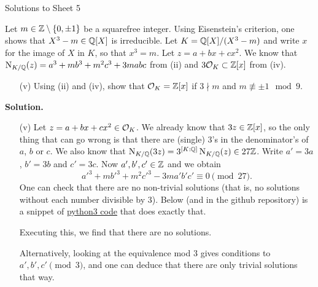 \documentclass[a4paper,11pt]{article}
\begin{document}
\begin{center}
    \huge{Solutions to Sheet 5}
\end{center}

Let $m \in \mathbb{Z} \setminus\{0, \pm 1\}$ be a squarefree integer. Using Eisenstein's
criterion, one shows that $X^3 - m \in \mathbb{Q}[X]$ is irreducible. Let $K =
\mathbb{Q}[X]/(X^3 -m)$ and write $x$ for the image of $X$ in $K$, so that $x^3 = m$.
Let $z = a + bx + cx^2$. We know that $\operatorname{N}_{K/\mathbb{Q}}(z) = a^3 + mb^3 + m^2 c^3 +
3mabc$ from (ii) and $3\mathcal{O}_K \subset \mathbb{Z}[x]$ from (iv). 
\begin{enumerate}
    \item[(v)] Using (ii) and (iv), show that $\mathcal{O}_K = \mathbb{Z}[x]$ if $3 \nmid m$
        and $m \not \equiv \pm 1 \mod 9$. 
\end{enumerate}

\textbf{Solution.}

\begin{itemize}[wide, labelindent=0pt]
\item[(v)] Let $z = a + bx + cx^2 \in \mathcal{O}_K$. We already know that 
    $3z \in \mathbb{Z}[x]$, so the only thing that can go wrong is that there
    are (single) 3's in the denominator's of $a$, $b$ or $c$. 
    We also know that $\operatorname{N}_{K/\mathbb{Q}}(3z) = 3^{[K:\mathbb{Q}]}\operatorname{N}_{K/\mathbb{Q}}(z) \in 27\mathbb{Z}$. 
    Write $a' = 3a$, $b' = 3b$ and $c' = 3c$. Now $a', b', c' \in \mathbb{Z}$ and we obtain
    \begin{equation*}
    a'^3 + mb'^3 + m^2 c'^3 - 3ma'b'c' \equiv 0 \pmod {27}.
    \end{equation*}
    One can check that there are no non-trivial solutions (that is, no
    solutions without each number divisible by 3).
    Below (and in the github repository) is a snippet of \href{solutions.py}{python3
    code} that does exactly that.
    
    Executing this, we find that there are no solutions. 

    Alternatively, looking at the equivalence mod $3$ gives conditions to $a',
    b', c' \pmod 3$, and one can deduce that there are only trivial solutions
    that way.
\end{itemize}
\end{document}

